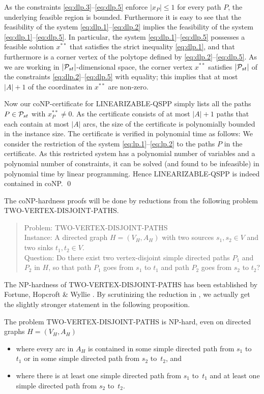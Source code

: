 \documentclass[11pt,fleqn]{article}
\begin{document}
As the constraints \eqref{eq:dlp.3}--\eqref{eq:dlp.5} enforce $|x_P|\le1$ for every path $P$, 
the underlying feasible region is bounded.
Furthermore it is easy to see that the feasibility of the system \eqref{eq:dlp.1}--\eqref{eq:dlp.2} 
implies the feasibility of the system \eqref{eq:dlp.1}--\eqref{eq:dlp.5}.
In particular, the system \eqref{eq:dlp.1}--\eqref{eq:dlp.5} possesses a feasible solution $x^{**}$ 
that satisfies the strict inequality \eqref{eq:dlp.1}, and 
that furthermore is a corner vertex of the polytope defined by \eqref{eq:dlp.2}--\eqref{eq:dlp.5}.
As we are working in $|{\cal P}_{st}|$-dimensional space, the corner vertex $x^{**}$ satisfies $|{\cal P}_{st}|$ of 
the constraints \eqref{eq:dlp.2}--\eqref{eq:dlp.5} with equality; this implies that at most $|A|+1$ 
of the coordinates in $x^{**}$ are non-zero.

Now our coNP-certificate for LINEARIZABLE-QSPP simply lists all the paths $P\in{\cal P}_{st}$ with $x^{**}_P\ne0$.
As the certificate consists of at most $|A|+1$ paths that each contain at most $|A|$ arcs, the
size of the certificate is polynomially bounded in the instance size.
The certificate is verified in polynomial time as follows:
We consider the restriction of the system \eqref{eq:lp.1}--\eqref{eq:lp.2} to the paths $P$ 
in the certificate.
As this restricted system has a polynomial number of variables and a polynomial number of constraints,
it can be solved (and found to be infeasible) in polynomial time by linear programming.
Hence LINEARIZABLE-QSPP is indeed contained in coNP.
\qed

\bigskip
The coNP-hardness proofs will be done by reductions from the following problem TWO-VERTEX-DISJOINT-PATHS.
\begin{quote}
Problem: TWO-VERTEX-DISJOINT-PATHS
\\[1.0ex]
Instance: A directed graph $H=(V_H,A_H)$ with two sources $s_1,s_2\in V$ and two sinks $t_1,t_2\in V$.
\\[1.0ex]
Question: Do there exist two vertex-disjoint simple directed paths $P_1$ and $P_2$ in $H$,
so that path $P_1$ goes from $s_1$ to $t_1$ and path $P_2$ goes from $s_2$ to $t_2$?
\end{quote}
The NP-hardness of TWO-VERTEX-DISJOINT-PATHS has been established by Fortune, Hopcroft \& Wyllie \cite{FoHoWy1980}.
By scrutinizing the reduction in \cite{FoHoWy1980}, we actually get the slightly stronger statement
in the following proposition.
\begin{proposition}
\label{pr:FHW}
\cite{FoHoWy1980}
The problem TWO-VERTEX-DIS\-JOINT-PATHS is NP-hard, even on directed graphs $H=(V_H,A_H)$
\begin{itemize}
\item where every arc in $A_H$ is contained in some simple directed path from $s_1$ to~$t_1$ 
or in some simple directed path from $s_2$ to~$t_2$, and
\item where there is at least one simple directed path from $s_1$ to~$t_1$ 
and at least one simple directed path from $s_2$ to~$t_2$.
\end{itemize}
\end{proposition}
\end{document}
